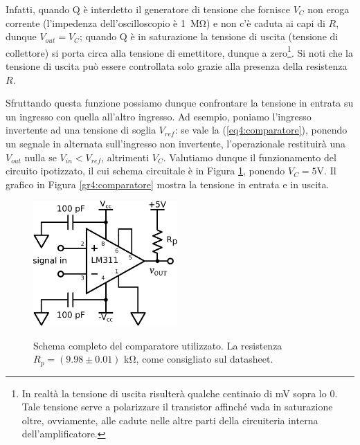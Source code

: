 Infatti, quando Q è interdetto il generatore di tensione che fornisce $V_C$ non eroga corrente (l'impedenza dell'oscilloscopio è \SI{1}{\Mohm}) e non c'è caduta ai capi di $R$, dunque $V_{out}=V_C$; quando Q è in saturazione la tensione di uscita (tensione di collettore) si porta circa alla tensione di emettitore, dunque a zero\footnote{In realtà la tensione di uscita risulterà qualche centinaio di \si{\milli\volt} sopra lo $0$. Tale tensione serve a polarizzare il transistor affinché vada in saturazione oltre, ovviamente, alle cadute nelle altre parti della circuiteria interna dell'amplificatore.}. Si noti che la tensione di uscita può essere controllata solo grazie alla presenza della resistenza $R$.

Sfruttando questa funzione possiamo dunque confrontare la tensione in entrata su un ingresso con quella all'altro ingresso. Ad esempio, poniamo l'ingresso invertente ad una tensione di soglia $V_{ref}$: se vale la (\ref{eq4:comparatore}), ponendo un segnale in alternata sull'ingresso non invertente, l'operazionale restituirà una $V_{out}$ nulla se $V_{in}<V_{ref}$, altrimenti $V_C$. Valutiamo dunque il funzionamento del circuito ipotizzato, il cui schema circuitale è in Figura \ref{cir4:comparatore}, ponendo $V_{C}=5$\si{\volt}. Il grafico in Figura \ref{gr4:comparatore} mostra la tensione in entrata e in uscita.

\begin{figure}[ht]
 \centering
   {\includegraphics[width=5.5cm]{../E04/latex/c_comparatore.pdf}}
 \caption{Schema completo del comparatore utilizzato. La resistenza $R_p=(9.98 \pm 0.01)$ \si{\kilo\ohm}, come consigliato sul datasheet.}
 \label{cir4:comparatore}
\end{figure}

